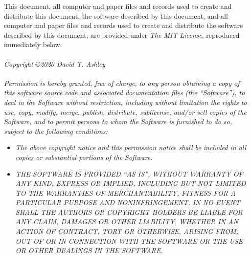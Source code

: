 \pagebreak
\thispagestyle{empty}
\begin{small}
\noindent{}This document, all computer and paper files and records used to create and
distribute this document, the software described by this document, and all computer
and paper files and records used to create and distribute the software described by
this document, are provided under \emph{The MIT License}, reproduced immediately below.\\\\
\noindent{}\emph{Copyright \copyright 2020 David T. Ashley}\\\\
\noindent{}\emph{Permission is hereby granted, free of charge, to any person obtaining a copy
of this software source code and associated documentation files (the
``Software''), to deal in the Software without restriction, including without
limitation the rights to use, copy, modify, merge, publish, distribute,
sublicense, and/or sell copies of the Software, and to permit persons to whom
the Software is furnished to do so, subject to the following conditions:}

\begin{itemize}
\item \emph{The above copyright notice and this permission notice shall be included in
      all copies or substantial portions of the Software.}
\item \emph{THE SOFTWARE IS PROVIDED ``AS IS'', WITHOUT WARRANTY OF ANY KIND, EXPRESS OR
      IMPLIED, INCLUDING BUT NOT LIMITED TO THE WARRANTIES OF MERCHANTABILITY,
      FITNESS FOR A PARTICULAR PURPOSE AND NONINFRINGEMENT\@. IN NO EVENT SHALL THE
      AUTHORS OR COPYRIGHT HOLDERS BE LIABLE FOR ANY CLAIM, DAMAGES OR OTHER
      LIABILITY, WHETHER IN AN ACTION OF CONTRACT, TORT OR OTHERWISE, ARISING FROM,
      OUT OF OR IN CONNECTION WITH THE SOFTWARE OR THE USE OR OTHER DEALINGS IN
      THE SOFTWARE.}
\end{itemize}
\end{small}

\vfill
